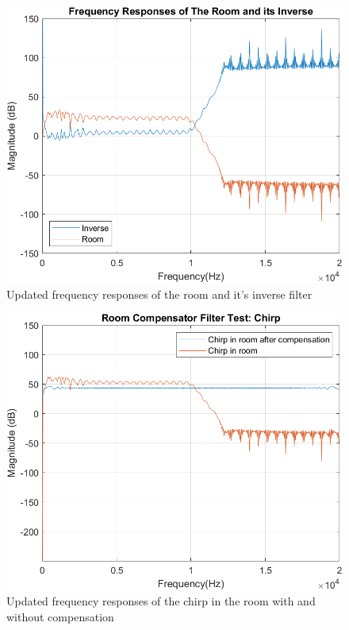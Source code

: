 \documentclass[conference]{IEEEtran}
\begin{document}
        \begin{figure}[H]
            \centering
            \includegraphics[scale = 0.55]{resources/origAndInverse2.png}
            \caption{Updated frequency responses of the room and it's inverse filter}
            \label{origAndInverse2}
        \end{figure}
        \begin{figure}[H]
            \centering
            \includegraphics[scale = 0.55]{resources/chirpComparison2.png}
            \caption{Updated frequency responses of the chirp in the room with and without compensation}
            \label{chirpComparison2}
        \end{figure}
\end{document}
